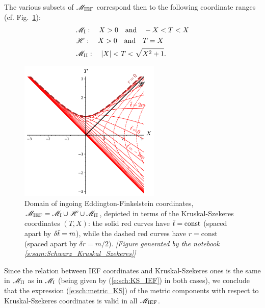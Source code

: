     \iff
\ee
The various subsets of $\mathscr{M}_{\rm IEF}$ correspond then to the following
coordinate ranges (cf. Fig.~\ref{f:sch:IEF_KS}):
\begin{subequations}
\label{e:max:range_TX_M_I_II}
\begin{align}
 & \mathscr{M}_{\rm I}: \quad X > 0 \quad\mbox{and}\quad -X < T < X \\
 & \mathscr{H}: \quad X > 0 \quad\mbox{and}\quad  T = X \\
 & \mathscr{M}_{\rm II}: \quad |X| < T < \sqrt{X^2+1} .
\end{align}
\end{subequations}

\begin{figure}
\centerline{\includegraphics[width=0.6\textwidth]{max_IEF_KS.pdf}}
\caption[]{\label{f:sch:IEF_KS} \footnotesize
Domain of ingoing Eddington-Finkelstein coordinates, $\mathscr{M}_{\rm IEF} = \mathscr{M}_{\rm I}\cup \mathscr{H}\cup \mathscr{M}_{\rm II}$, depicted in terms of the Kruskal-Szekeres coordinates $(T,X)$: the solid red
curves have ${\tilde t}=\mathrm{const}$ (spaced apart by $\delta{\tilde t} = m$), while the
dashed red curves have $r=\mathrm{const}$ (spaced apart by $\delta r = m/2$).
\textsl{[Figure generated by the notebook \ref{s:sam:Schwarz_Kruskal_Szekeres}]}
}
\end{figure}


Since the relation between IEF coordinates and Kruskal-Szekeres ones is the
same in $\mathscr{M}_{\rm II}$ as in $\mathscr{M}_{\rm I}$ (being given by (\ref{e:sch:KS_IEF})
in both cases), we conclude that the expression (\ref{e:sch:metric_KS})
of the metric components with respect to
Kruskal-Szekeres coordinates is valid in all $\mathscr{M}_{\rm IEF}$.

